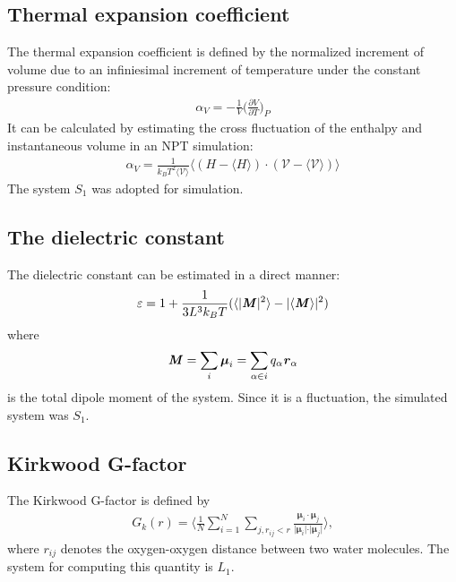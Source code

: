\documentclass[aip,jcp,a4paper,preprint,unsortedaddress,onecolumn,fleqn]{revtex4-1}
\newcommand{\eps}{\varepsilon}
\newcommand{\vect}[1]{\textbf{\textit{#1}}}
\newcommand{\systemsb}{S_1}
\newcommand{\systemlb}{L_1}
\begin{document}
\subsection{Thermal expansion coefficient}
The thermal expansion coefficient is defined by
the normalized increment of volume due to an infiniesimal
increment of temperature under the constant pressure condition:
\begin{align}
  \alpha_V = - \frac 1V \Big(\frac{\partial V}{\partial T}\Big)_P
\end{align}
It can be calculated by estimating the cross fluctuation
of the enthalpy and instantaneous volume  in an NPT simulation:
\begin{align}
  \alpha_V = \frac{1}{k_BT^2\langle \mathcal V\rangle} \langle (H - \langle H\rangle)\cdot(\mathcal V - \langle \mathcal V\rangle) \rangle
\end{align}
The system $\systemsb$ was adopted for simulation.


\subsection{The dielectric constant}

The dielectric constant can be estimated in a direct manner:
\begin{align}
  \eps = 1 + \frac{1}{3L^3 k_BT} ( \langle \vert \vect M\vert^2\rangle - \vert\langle \vect M\rangle\vert^2 )
\end{align}
where
\begin{align}
  \vect M = \sum_i\boldsymbol\mu_i = \sum_{\alpha\in i} q_\alpha\vect r_\alpha
\end{align}
is the total dipole moment of the system. Since it is a fluctuation, the simulated system was $\systemsb$.

\subsection{Kirkwood G-factor}

The Kirkwood G-factor is defined by~\cite{vanderSpoel2006origin}
\begin{align}
  G_k(r) =
  \Big\langle
  \frac 1N
  \sum_{i=1}^N \sum_{j, r_{ij} < r}
  \frac {\boldsymbol\mu_i \cdot \boldsymbol\mu_j}{\vert \boldsymbol\mu_i\vert \cdot \vert\boldsymbol\mu_j\vert}
  \Big\rangle,
\end{align}
where $r_{ij}$ denotes the oxygen-oxygen distance between two water
molecules.  The system for computing this quantity is $\systemlb$.
\end{document}

